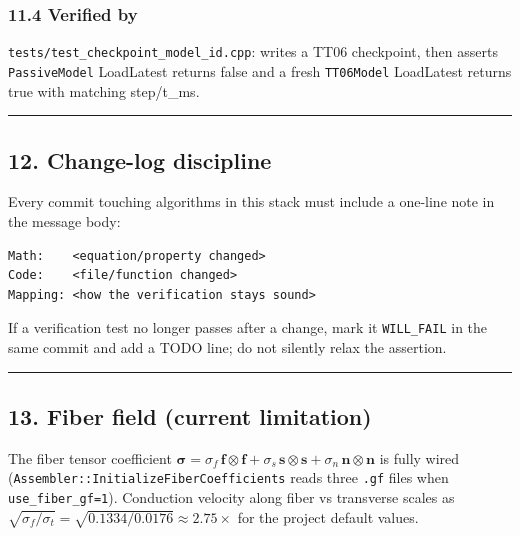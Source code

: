 \documentclass[
  11pt,
]{article}
\begin{document}
\hypertarget{verified-by}{%
\subsubsection{11.4 Verified by}\label{verified-by}}

\texttt{tests/test\_checkpoint\_model\_id.cpp}: writes a TT06
checkpoint, then asserts \texttt{PassiveModel} LoadLatest returns false
and a fresh \texttt{TT06Model} LoadLatest returns true with matching
step/t\_ms.

\begin{center}\rule{0.5\linewidth}{0.5pt}\end{center}

\hypertarget{change-log-discipline}{%
\subsection{12. Change-log discipline}\label{change-log-discipline}}

Every commit touching algorithms in this stack must include a one-line
note in the message body:

\begin{verbatim}
Math:    <equation/property changed>
Code:    <file/function changed>
Mapping: <how the verification stays sound>
\end{verbatim}

If a verification test no longer passes after a change, mark it
\texttt{WILL\_FAIL} in the same commit and add a TODO line; do not
silently relax the assertion.

\begin{center}\rule{0.5\linewidth}{0.5pt}\end{center}

\hypertarget{fiber-field-current-limitation}{%
\subsection{13. Fiber field (current
limitation)}\label{fiber-field-current-limitation}}

The fiber tensor coefficient
\(\boldsymbol\sigma = \sigma_f\, \mathbf{f}\!\otimes\!\mathbf{f} + \sigma_s\, \mathbf{s}\!\otimes\!\mathbf{s} + \sigma_n\, \mathbf{n}\!\otimes\!\mathbf{n}\)
is fully wired (\texttt{Assembler::InitializeFiberCoefficients} reads
three \texttt{.gf} files when \texttt{use\_fiber\_gf=1}). Conduction
velocity along fiber vs transverse scales as
\(\sqrt{\sigma_f / \sigma_t} = \sqrt{0.1334/0.0176} \approx 2.75\times\)
for the project default values.
\end{document}
